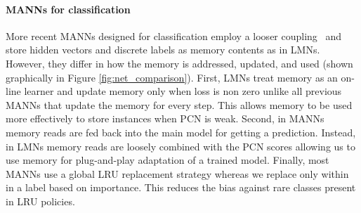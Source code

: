 \documentclass[letterpaper]{article} %
\newcommand{\vek}[1]{{\bf {#1}}}
\newcommand{\vh}{{\vek{h}}}
\def\sunita#1{\todo [color=purple]{Sunita: #1}}
\begin{document}


\paragraph{MANNs for classification}
More recent MANNs designed for classification employ a looser coupling~\cite{kaiser2017,SantoroBBWL16} and store hidden vectors and discrete labels as memory contents as in LMNs.
%
However, they differ in how the memory is addressed, updated, and used (shown graphically in Figure \ref{fig:net_comparison}).
First, LMNs treat memory as an on-line learner and update memory only when loss is non zero unlike all previous MANNs that update the memory for every step.  This allows memory to be used more effectively to store instances when PCN is weak.
Second, in MANNs memory reads are fed back into the main model for getting a prediction.  Instead, in LMNs memory reads are loosely combined with the PCN scores allowing us to use memory for plug-and-play adaptation of a trained model.  Finally, most MANNs use a global LRU replacement strategy whereas we replace only within in a label based on importance. This reduces the bias against rare classes present in LRU policies.




%
\end{document}
